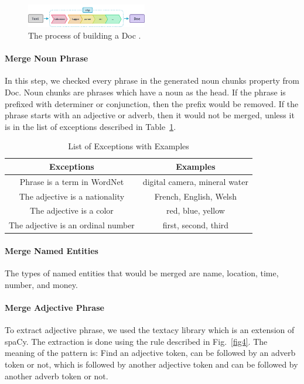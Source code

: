 \documentclass[a4paper,conference]{IEEEtran}
\begin{document}
\begin{figure}[htbp]
\centerline{\includegraphics[width=0.47\textwidth]{fig3.png}}
\caption{The process of building a Doc \cite{b18}.}
\label{fig3}
\end{figure}

\paragraph{Merge Noun Phrase}
In this step, we checked every phrase in the generated noun chunks property from Doc. Noun chunks are phrases which have a noun as the head. If the phrase is prefixed with determiner or conjunction, then the prefix would be removed. If the phrase starts with an adjective or adverb, then it would not be merged, unless it is in the list of exceptions described in Table~\ref{tab1}. 

\begin{table}[htbp]
\caption{List of Exceptions with Examples}
\begin{center}
\begin{tabular}{|c|c|}
\hline
\textbf{Exceptions} & \textbf{Examples}\\
\hline
Phrase is a term in WordNet&digital camera, mineral water\\
\hline
The adjective is a nationality&French, English, Welsh\\
\hline
The adjective is a color&red, blue, yellow\\
\hline
The adjective is an ordinal number&first, second, third\\
\hline
\end{tabular}
\label{tab1}
\end{center}
\end{table}

\paragraph{Merge Named Entities}
The types of named entities that would be merged are name, location, time, number, and money.

\paragraph{Merge Adjective Phrase}
To extract adjective phrase, we used the textacy library which is an extension of spaCy. The extraction is done using the rule described in Fig.~\ref{fig4}. The meaning of the pattern is: Find an adjective token, can be followed by an adverb token or not, which is followed by another adjective token and can be followed by another adverb token or not.
\end{document}
